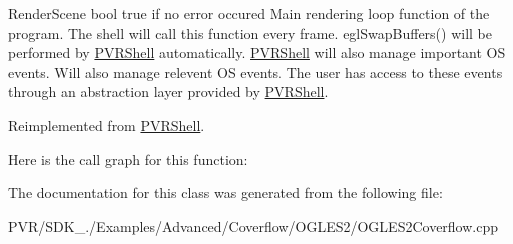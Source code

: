   Render\+Scene  bool true if no error occured  Main rendering loop function of the program. The shell will call this function every frame. egl\+Swap\+Buffers() will be performed by \hyperlink{class_p_v_r_shell}{P\+V\+R\+Shell} automatically. \hyperlink{class_p_v_r_shell}{P\+V\+R\+Shell} will also manage important O\+S events. Will also manage relevent O\+S events. The user has access to these events through an abstraction layer provided by \hyperlink{class_p_v_r_shell}{P\+V\+R\+Shell}. 

Reimplemented from \hyperlink{class_p_v_r_shell_ae0eb5f797cbe993a22b8659f9c332578}{P\+V\+R\+Shell}.



Here is the call graph for this function\+:




The documentation for this class was generated from the following file\+:\begin{DoxyCompactItemize}
\item 
P\+V\+R/\+S\+D\+K\+\_./\+Examples/\+Advanced/\+Coverflow/\+O\+G\+L\+E\+S2/O\+G\+L\+E\+S2\+Coverflow.\+cpp\end{DoxyCompactItemize}
